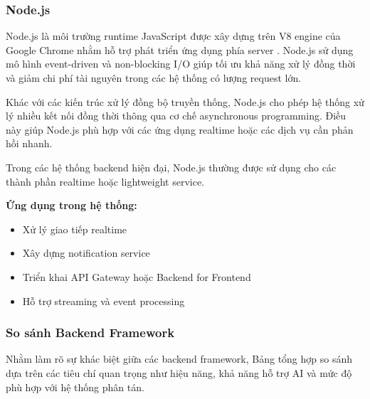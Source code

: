 
\subsubsection{Node.js}

Node.js là môi trường runtime JavaScript được xây dựng trên V8 engine của Google Chrome nhằm hỗ trợ phát triển ứng dụng phía server \parencite{nodejsdocs2024}. Node.js sử dụng mô hình event-driven và non-blocking I/O giúp tối ưu khả năng xử lý đồng thời và giảm chi phí tài nguyên trong các hệ thống có lượng request lớn.

Khác với các kiến trúc xử lý đồng bộ truyền thống, Node.js cho phép hệ thống xử lý nhiều kết nối đồng thời thông qua cơ chế asynchronous programming. Điều này giúp Node.js phù hợp với các ứng dụng realtime hoặc các dịch vụ cần phản hồi nhanh.

Trong các hệ thống backend hiện đại, Node.js thường được sử dụng cho các thành phần realtime hoặc lightweight service.

\textbf{Ứng dụng trong hệ thống:}
\begin{itemize}
    \item Xử lý giao tiếp realtime
    
    \item Xây dựng notification service
    
    \item Triển khai API Gateway hoặc Backend for Frontend
    
    \item Hỗ trợ streaming và event processing
\end{itemize}

\subsubsection{So sánh Backend Framework}

Nhằm làm rõ sự khác biệt giữa các backend framework, Bảng  tổng hợp so sánh dựa trên các tiêu chí quan trọng như hiệu năng, khả năng hỗ trợ AI và mức độ phù hợp với hệ thống phân tán.

